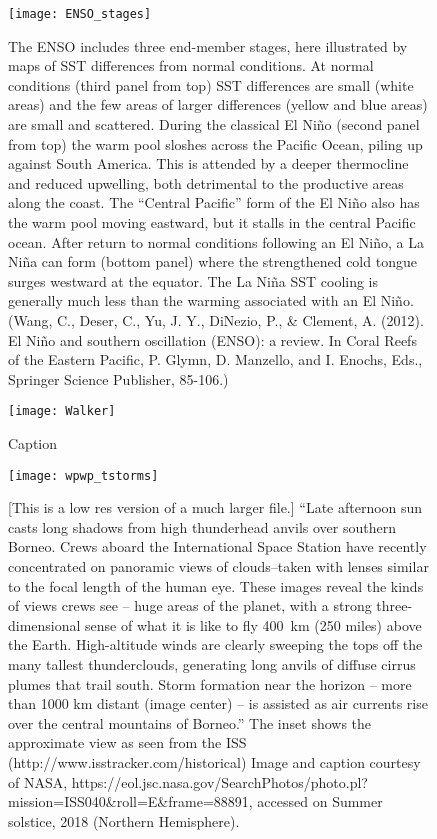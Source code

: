 {\newpage
\begin{figure}[ht]
\centering
\texttt{[image: ENSO\_stages]}%
\caption{The ENSO includes three end-member stages, here illustrated by maps of SST differences from normal conditions. At normal conditions (third panel from top) SST differences are small (white areas) and the few areas of larger differences (yellow and blue areas) are small and scattered. During the classical El Ni\~no (second panel from top) the warm pool sloshes across the Pacific Ocean, piling up against South America. This is attended by a deeper thermocline and reduced upwelling, both detrimental to the productive areas along the coast. The ``Central Pacific'' form of the El Ni\~no also has the warm pool moving eastward, but it stalls in the central Pacific ocean. After return to normal conditions following an El Ni\~no, a La Ni\~na can form (bottom panel) where the strengthened cold tongue surges westward at the equator. The La Ni\~na SST cooling is generally much less than the warming associated with an El Ni\~no. (Wang, C., Deser, C., Yu, J. Y., DiNezio, P., \& Clement, A. (2012). El Ni\~no and southern oscillation (ENSO): a review. In Coral Reefs of the Eastern Pacific, P. Glymn, D. Manzello, and I. Enochs, Eds., Springer Science Publisher, 85-106.)}    
\label{fig:enso_stages}
\end{figure} 

\newpage
\begin{figure}[ht]
\centering
\texttt{[image: Walker]}%
\caption{Caption}    
\label{fig:walker}
\end{figure} %


\newpage
\begin{figure}[ht]
\centering
\texttt{[image: wpwp\_tstorms]}%
\caption{[This is a low res version of a much larger file.] ``Late afternoon sun casts long shadows from high thunderhead anvils over southern Borneo. Crews aboard the International Space Station have recently concentrated on panoramic views of clouds--taken with lenses similar to the focal length of the human eye. These images reveal the kinds of views crews see -- huge areas of the planet, with a strong three-dimensional sense of what it is like to fly \SI{400}{\kilo\metre} (250 miles) above the Earth. High-altitude winds are clearly sweeping the tops off the many tallest thunderclouds, generating long anvils of diffuse cirrus plumes that trail south. Storm formation near the horizon -- more than 1000 km distant (image center) -- is assisted as air currents rise over the central mountains of Borneo.'' The inset shows the approximate view as seen from the ISS (http://www.isstracker.com/historical) Image and caption courtesy of NASA, https://eol.jsc.nasa.gov/SearchPhotos/photo.pl?mission=ISS040\&roll=E\&frame=88891, accessed on Summer solstice, 2018 (Northern Hemisphere).}    
\label{fig:wpwp_tstorms}
\end{figure} 



}
